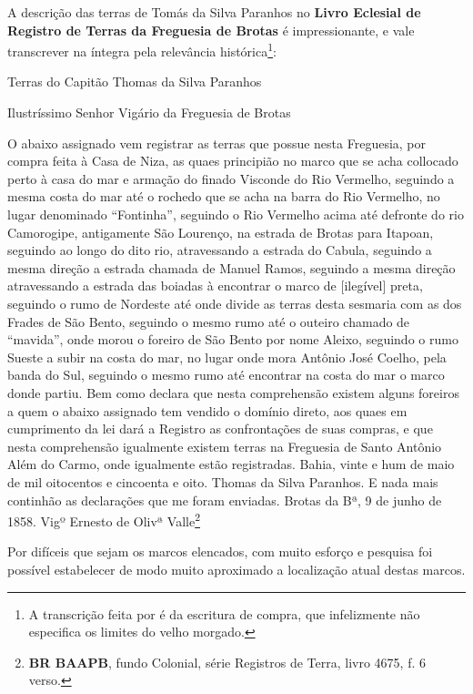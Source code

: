 A descrição das terras de Tomás da Silva Paranhos no \textbf{Livro Eclesial de Registro de Terras da Freguesia de Brotas} é impressionante, e vale transcrever na íntegra pela relevância histórica\footnote{A transcrição feita por  é da escritura de compra, que infelizmente não especifica os limites do velho morgado.}:

\begin{citacao}
Terras do Capitão Thomas da Silva Paranhos

Ilustríssimo Senhor Vigário da Freguesia de Brotas

O abaixo assignado vem registrar as terras que possue nesta Freguesia, por compra feita à Casa de Niza, as quaes principião no marco que se acha collocado perto à casa do mar e armação do finado Visconde do Rio Vermelho, seguindo a mesma costa do mar até o rochedo que se acha na barra do Rio Vermelho, no lugar denominado ``Fontinha'', seguindo o Rio Vermelho acima até defronte do rio Camorogipe, antigamente São Lourenço, na estrada de Brotas para Itapoan, seguindo ao longo do dito rio, atravessando a estrada do Cabula, seguindo a mesma direção a estrada chamada de Manuel Ramos, seguindo a mesma direção atravessando a estrada das boiadas à encontrar o marco de [{ilegível}] preta, seguindo o rumo de Nordeste até onde divide as terras desta sesmaria com as dos Frades de São Bento, seguindo o mesmo rumo até o outeiro chamado de ``mavida'', onde morou o foreiro de São Bento por nome Aleixo, seguindo o rumo Sueste a subir na costa do mar, no lugar onde mora Antônio José Coelho, pela banda do Sul, seguindo o mesmo rumo até encontrar na costa do mar o marco donde partiu. Bem como declara que nesta comprehensão existem alguns foreiros a quem o abaixo assignado tem vendido o domínio direto, aos quaes em cumprimento da lei dará a Registro as confrontações de suas compras, e que nesta comprehensão igualmente existem terras na Freguesia de Santo Antônio Além do Carmo, onde igualmente estão registradas. Bahia, vinte e hum de maio de mil oitocentos e cincoenta e oito. Thomas da Silva Paranhos. E nada mais continhão as declarações que me foram enviadas. Brotas da Bª, 9 de junho de 1858. Vigº Ernesto de Olivª Valle\footnote{\textbf{BR BAAPB}, fundo Colonial, série Registros de Terra, livro 4675, f. 6 verso.}
\end{citacao}

Por difíceis que sejam os marcos elencados, com muito esforço e pesquisa foi possível estabelecer de modo muito aproximado a localização atual destas marcos.

